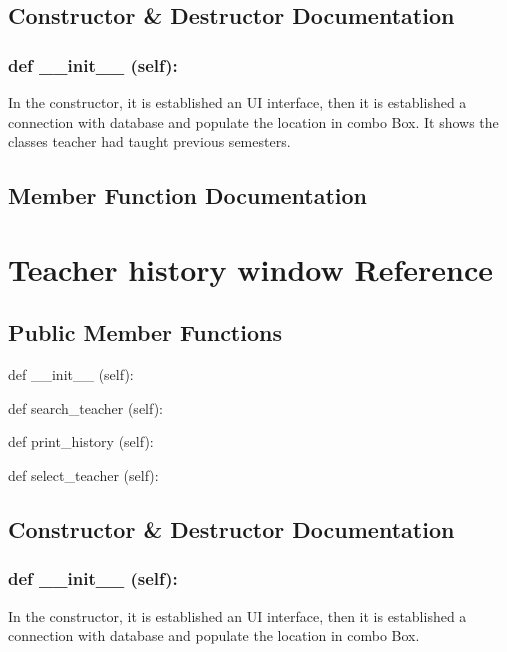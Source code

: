\subsection{Constructor \& Destructor Documentation}
\hypertarget{class_poly_aa3def076b74bed67904976ad4f9fe9b1}{
\subsubsection[{def __init__ (self):}]{\setlength{\rightskip}{0pt plus 5cm}def {\_\_init\_\_} (self): 
}}
In the constructor, it is established an UI interface, then it is  established a connection with database and populate the location in combo Box. It shows the classes teacher had taught previous semesters.
 
\subsection{Member Function Documentation}


\hypertarget{Teacher_history}{\section{Teacher history window Reference}
\label{Add_Class}
}
\subsection*{Public Member Functions}
\begin{DoxyCompactItemize}
\item 
def {\_\_init\_\_} (self):
\item 
def {search\_teacher} (self):
\item 
def {print\_history} (self):
\item 
def {select\_teacher} (self):
\end{DoxyCompactItemize}

\subsection{Constructor \& Destructor Documentation}
\hypertarget{class_poly_aa3def076b74bed67904976ad4f9fe9b1}{
\subsubsection[{def __init__ (self):}]{\setlength{\rightskip}{0pt plus 5cm}def {\_\_init\_\_} (self): 
}}
In the constructor, it is established an UI interface, then it is  established a connection with database and populate the location in combo Box.

